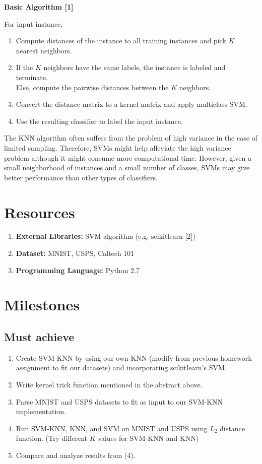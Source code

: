 \documentclass[11pt]{article}
\begin{document}
\newpage

\textbf{Basic Algorithm [1]}

For input instance,
\begin{enumerate}[(1)]
\item Compute distances of the instance to all training instances and pick $K$ nearest neighbors.
\item If the $K$ neighbors have the same labels, the instance is labeled and terminate.\\
\qquad Else, compute the pairwise distances between the $K$ neighbors.
\item Convert the distance matrix to a kernel matrix and apply multiclass SVM.
\item Use the resulting classifier to label the input instance.
\end{enumerate}

The KNN algorithm often suffers from the problem of high variance in the case of limited sampling. Therefore, SVMs might help alleviate the high variance problem although it might consume more computational time. However, given a small neighborhood of instances and a small number of classes, SVMs may give better performance than other types of classifiers.

\section{Resources}

\begin{enumerate}[(1)]
\item \textbf{External Libraries:} SVM algorithm (e.g. scikitlearn [2])
\item \textbf{Dataset:} MNIST, USPS, Caltech 101
\item \textbf{Programming Language:} Python 2.7
\end{enumerate}

\section{Milestones}
\subsection{Must achieve}

\begin{enumerate}[(1)]
\item Create SVM-KNN by using our own KNN (modify from previous homework assignment to fit our datasets) and incorporating scikitlearn's SVM.
\item Write kernel trick function mentioned in the abstract above.
\item Parse MNIST and USPS datasets to fit as input to our SVM-KNN implementation.
\item Run SVM-KNN, KNN, and SVM on MNIST and USPS using $L_2$ distance function. (Try different $K$ values for SVM-KNN and KNN)
\item Compare and analyze results from (4).
\end{enumerate}
\end{document}
